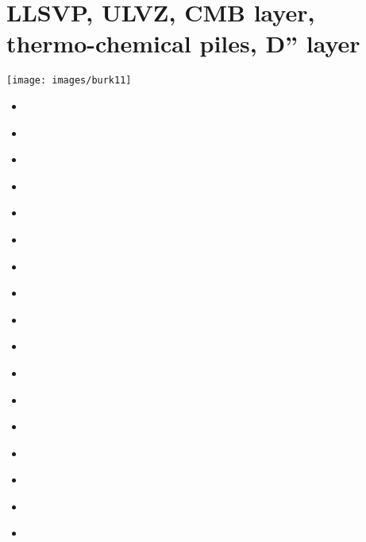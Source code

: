 \section{LLSVP, ULVZ, CMB layer, thermo-chemical piles, D'' layer}

\begin{center}
\texttt{[image: images/burk11]}\cite{burk11}
\end{center}

\begin{scriptsize}
\begin{itemize}
\item[\nineteeneighty]       
\textcite{yupe80} 
\item[\nineteeneightysix]    
\textcite{dagu86} 
\item[\nineteeneightyeight]  
\textcite{hayu88} 
\item[\nineteeneightynine]   
\textcite{hayu89} 
\item[\nineteenninetyfour]   
\textcite{ride94} 
\item[\nineteenninetysix]    
\textcite{boeh96} 
\item[\nineteenninetyseven]  
\textcite{kell97} 
\item[\nineteenninetyeight]  
\textcite{tack98b} 
\item[\twothousandone]       
\textcite{soga01} 
\item[\twothousandtwo]       
\textcite{somo02} 
\textcite{tagh02} 
\item[\twothousandfour]      
\textcite{mczh04} 
\textcite{nata04} 
\item[\twothousandfive]      
\textcite{nata05} 
\textcite{wyso05} 
\textcite{mczh05a} 
\textcite{nata05b}
\item[\twothousandsix]       
\textcite{nata06} 
\item[\twothousandseven]     
\textcite{heta07}
\textcite{moyu07} 
\textcite{pelt07} 
\textcite{hibl07} 
\textcite{yumc07} 
\item[\twothousandeight]     
\textcite{gamc08} 
\textcite{nata08} 
\textcite{stho08} 
\item[\twothousandnine]
\textcite{bumr09} 
\item[\twothousandten]
\textcite{stto10} 
\textcite{mcgr10} 

\end{itemize}
\end{scriptsize}
